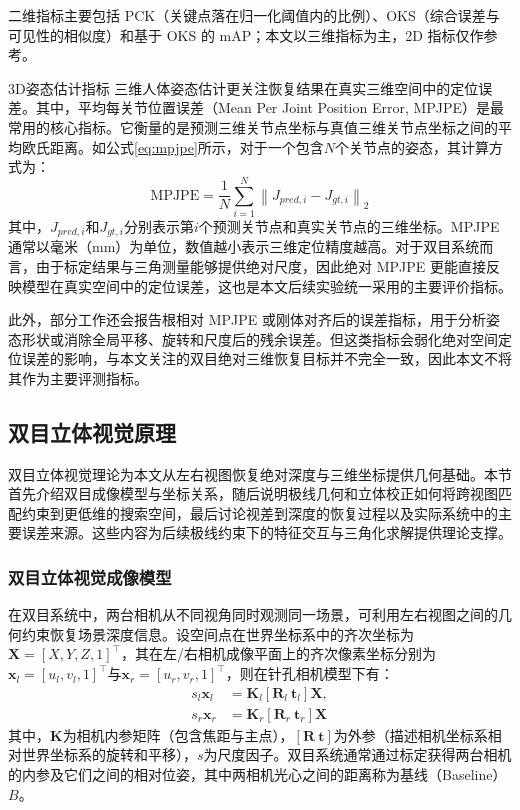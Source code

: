 二维指标主要包括 PCK（关键点落在归一化阈值内的比例）、OKS（综合误差与可见性的相似度）和基于 OKS 的 mAP；本文以三维指标为主，2D 指标仅作参考。

3D姿态估计指标
三维人体姿态估计更关注恢复结果在真实三维空间中的定位误差。其中，平均每关节位置误差（Mean Per Joint Position Error, MPJPE）是最常用的核心指标。它衡量的是预测三维关节点坐标与真值三维关节点坐标之间的平均欧氏距离。如公式\ref{eq:mpjpe}所示，对于一个包含$N$个关节点的姿态，其计算方式为：
\begin{equation}
\text{MPJPE} = \frac{1}{N} \sum_{i=1}^{N} \left\| J_{pred, i} - J_{gt, i} \right\|_2
\label{eq:mpjpe}
\end{equation}
其中，$J_{pred, i}$和$J_{gt, i}$分别表示第$i$个预测关节点和真实关节点的三维坐标。MPJPE通常以毫米（mm）为单位，数值越小表示三维定位精度越高。对于双目系统而言，由于标定结果与三角测量能够提供绝对尺度，因此绝对 MPJPE 更能直接反映模型在真实空间中的定位误差，这也是本文后续实验统一采用的主要评价指标。

此外，部分工作还会报告根相对 MPJPE 或刚体对齐后的误差指标，用于分析姿态形状或消除全局平移、旋转和尺度后的残余误差。但这类指标会弱化绝对空间定位误差的影响，与本文关注的双目绝对三维恢复目标并不完全一致，因此本文不将其作为主要评测指标。




\subsection{双目立体视觉原理}
双目立体视觉理论为本文从左右视图恢复绝对深度与三维坐标提供几何基础。本节首先介绍双目成像模型与坐标关系，随后说明极线几何和立体校正如何将跨视图匹配约束到更低维的搜索空间，最后讨论视差到深度的恢复过程以及实际系统中的主要误差来源。这些内容为后续极线约束下的特征交互与三角化求解提供理论支撑。

\subsubsection{双目立体视觉成像模型}
\label{subsec:stereo_principle}
在双目系统中，两台相机从不同视角同时观测同一场景，可利用左右视图之间的几何约束恢复场景深度信息。设空间点在世界坐标系中的齐次坐标为$\mathbf{X}=[X,Y,Z,1]^\top$，其在左/右相机成像平面上的齐次像素坐标分别为$\mathbf{x}_l=[u_l,v_l,1]^\top$与$\mathbf{x}_r=[u_r,v_r,1]^\top$，则在针孔相机模型下有：
\begin{align}
s_l \mathbf{x}_l &= \mathbf{K}_l \left[\mathbf{R}_l \ \mathbf{t}_l\right]\mathbf{X},\nonumber\\
s_r \mathbf{x}_r &= \mathbf{K}_r \left[\mathbf{R}_r \ \mathbf{t}_r\right]\mathbf{X}
\label{eq:stereo_projection}
\end{align}
其中，$\mathbf{K}$为相机内参矩阵（包含焦距与主点），$\left[\mathbf{R}\ \mathbf{t}\right]$为外参（描述相机坐标系相对世界坐标系的旋转和平移），$s$为尺度因子。双目系统通常通过标定获得两台相机的内参及它们之间的相对位姿，其中两相机光心之间的距离称为基线（Baseline）$B$。

